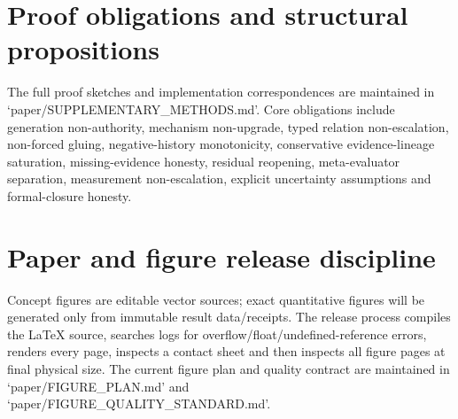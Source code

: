 \documentclass[11pt]{article}
\begin{document}
\appendix
\section{Proof obligations and structural propositions}
The full proof sketches and implementation correspondences are maintained in `paper/SUPPLEMENTARY\_METHODS.md'. Core obligations include generation non-authority, mechanism non-upgrade, typed relation non-escalation, non-forced gluing, negative-history monotonicity, conservative evidence-lineage saturation, missing-evidence honesty, residual reopening, meta-evaluator separation, measurement non-escalation, explicit uncertainty assumptions and formal-closure honesty.

\section{Paper and figure release discipline}
Concept figures are editable vector sources; exact quantitative figures will be generated only from immutable result data/receipts. The release process compiles the LaTeX source, searches logs for overflow/float/undefined-reference errors, renders every page, inspects a contact sheet and then inspects all figure pages at final physical size. The current figure plan and quality contract are maintained in `paper/FIGURE\_PLAN.md' and `paper/FIGURE\_QUALITY\_STANDARD.md'.



\end{document}
